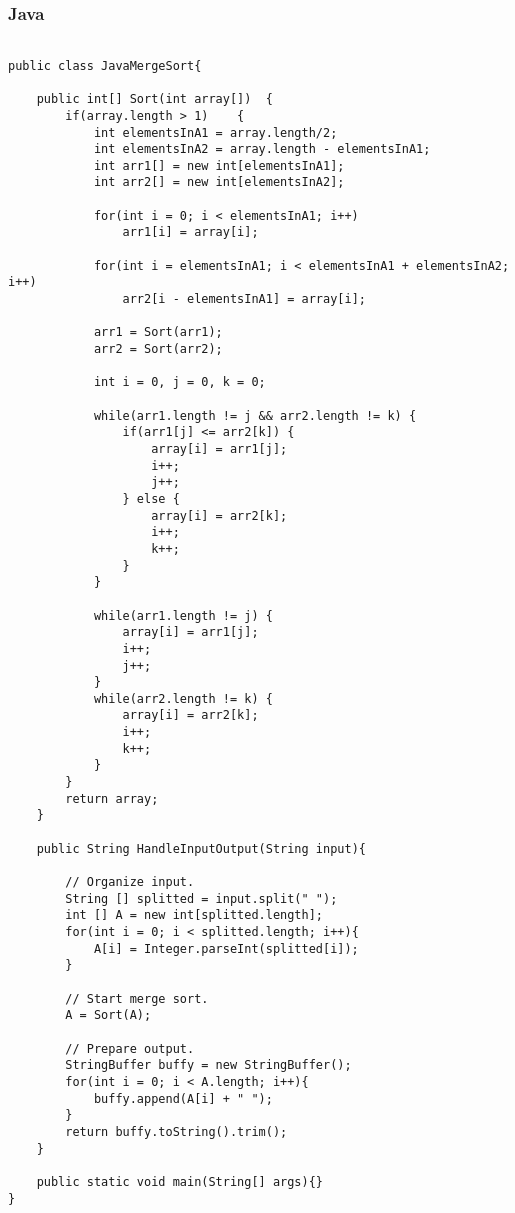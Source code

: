 \subsubsection{Java}
\lstset{style=java}
\begin{lstlisting}

public class JavaMergeSort{

	public int[] Sort(int array[])  {
		if(array.length > 1)  	{
			int elementsInA1 = array.length/2;
			int elementsInA2 = array.length - elementsInA1;
			int arr1[] = new int[elementsInA1];
			int arr2[] = new int[elementsInA2];

			for(int i = 0; i < elementsInA1; i++)
				arr1[i] = array[i];

			for(int i = elementsInA1; i < elementsInA1 + elementsInA2; i++)
				arr2[i - elementsInA1] = array[i];

			arr1 = Sort(arr1);
			arr2 = Sort(arr2);

			int i = 0, j = 0, k = 0;

			while(arr1.length != j && arr2.length != k) {
				if(arr1[j] <= arr2[k]) {
					array[i] = arr1[j];
					i++;
					j++;
				} else {
					array[i] = arr2[k];
					i++;
					k++;
				}
			}

			while(arr1.length != j) {
				array[i] = arr1[j];
				i++;
				j++;
			}
			while(arr2.length != k) {
				array[i] = arr2[k];
				i++;
				k++;
			}
		}
		return array;
	}

	public String HandleInputOutput(String input){

		// Organize input.
		String [] splitted = input.split(" ");
		int [] A = new int[splitted.length];
		for(int i = 0; i < splitted.length; i++){
			A[i] = Integer.parseInt(splitted[i]);
		}

		// Start merge sort.
		A = Sort(A);

		// Prepare output.
		StringBuffer buffy = new StringBuffer();
		for(int i = 0; i < A.length; i++){
			buffy.append(A[i] + " ");
		}
		return buffy.toString().trim();
	}

	public static void main(String[] args){}
}

\end{lstlisting}


